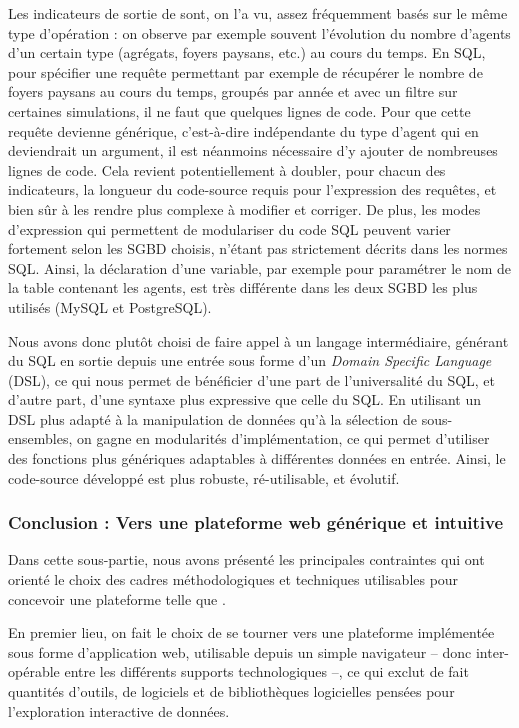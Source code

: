 Les indicateurs de sortie de \simfeodal{} sont, on l'a vu, assez fréquemment basés sur le même type d'opération : on observe par exemple souvent l'évolution du nombre d'agents d'un certain type (agrégats, foyers paysans, etc.) au cours du temps.
En SQL, pour spécifier une requête permettant par exemple de récupérer le nombre de foyers paysans au cours du temps, groupés par année et avec un filtre sur certaines simulations, il ne faut que quelques lignes de code.
Pour que cette requête devienne générique, c'est-à-dire indépendante du type d'agent qui en deviendrait un argument, il est néanmoins nécessaire d'y ajouter de nombreuses lignes de code.
Cela revient potentiellement à doubler, pour chacun des indicateurs, la longueur du code-source requis pour l'expression des requêtes, et bien sûr à les rendre plus complexe à modifier et corriger.
De plus, les modes d'expression qui permettent de modulariser du code SQL peuvent varier fortement selon les SGBD choisis, n'étant pas strictement décrits dans les normes SQL.
Ainsi, la déclaration d'une variable, par exemple pour paramétrer le nom de la table contenant les agents, est très différente dans les deux SGBD les plus utilisés (MySQL et PostgreSQL).

Nous avons donc plutôt choisi de faire appel à un langage intermédiaire, générant du SQL en sortie depuis une entrée sous forme d'un \og \textit{Domain Specific Language}\fg{} (DSL), ce qui nous permet de bénéficier d'une part de l'universalité du SQL, et d'autre part, d'une syntaxe plus expressive que celle du SQL.
En utilisant un DSL plus adapté à la manipulation de données qu'à la sélection de sous-ensembles, on gagne en modularités d'implémentation, ce qui permet d'utiliser des fonctions plus génériques adaptables à différentes données en entrée.
Ainsi, le code-source développé est plus robuste, ré-utilisable, et évolutif.

\subsubsection*{Conclusion : Vers une plateforme web générique et intuitive}

Dans cette sous-partie, nous avons présenté les principales contraintes qui ont orienté le choix des cadres méthodologiques et techniques utilisables pour concevoir une plateforme telle que \simedb{}.

En premier lieu, on fait le choix de se tourner vers une plateforme implémentée sous forme d'application web, utilisable depuis un simple navigateur -- donc inter-opérable entre les différents supports technologiques --, ce qui exclut de fait quantités d'outils, de logiciels et de bibliothèques logicielles pensées pour l'exploration interactive de données.

